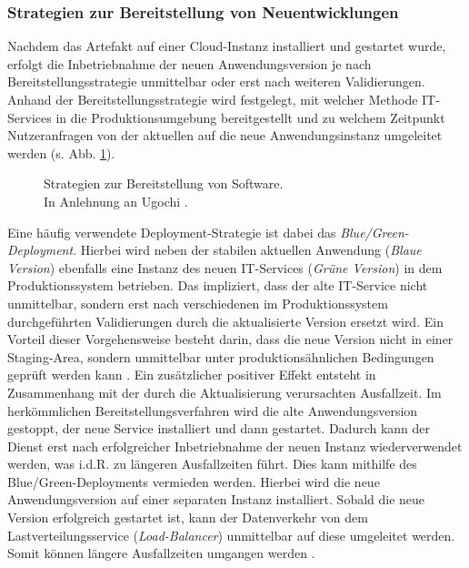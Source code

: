 \subsubsection{Strategien zur Bereitstellung von Neuentwicklungen}
\label{sec:Bereitstellungs_Strategien}
Nachdem das Artefakt auf einer Cloud-Instanz installiert und gestartet wurde, erfolgt die Inbetriebnahme der neuen Anwendungsversion je nach Bereitstellungsstrategie unmittelbar oder erst nach weiteren Validierungen. Anhand der Bereitstellungsstrategie wird festgelegt, mit welcher Methode IT-Services in die Produktionsumgebung bereitgestellt und zu welchem Zeitpunkt Nutzeranfragen von der aktuellen auf die neue Anwendungsinstanz umgeleitet werden (s. Abb. \ref{fig:DS}).
\begin{center}
	\begin{figure}[H]
		\centering
		\caption[Strategien zur Bereitstellung von Software]{Strategien zur Bereitstellung von Software.\\ In Anlehnung an Ugochi \cite{Ugochi.20220503}.}
		\label{fig:DS}
	\end{figure}
\end{center}
\vspace*{-15mm}
Eine häufig verwendete Deployment-Strategie ist dabei das \textit{Blue/Green-Deployment}. Hierbei wird neben der stabilen aktuellen Anwendung (\textit{Blaue Version}) ebenfalls eine Instanz des neuen IT-Services (\textit{Grüne Version}) in dem Produktionssystem betrieben. Das impliziert, dass der alte IT-Service nicht unmittelbar, sondern erst nach verschiedenen im Produktionssystem durchgeführten Validierungen durch die aktualisierte Version ersetzt wird. Ein Vorteil dieser Vorgehensweise besteht darin, dass die neue Version nicht in einer Staging-Area, sondern unmittelbar unter produktionsähnlichen Bedingungen geprüft werden kann \cite{Ugochi.20220503}. Ein zusätzlicher positiver Effekt entsteht in Zusammenhang mit der durch die Aktualisierung verursachten Ausfallzeit. Im herkömmlichen Bereitstellungsverfahren wird die alte Anwendungsversion gestoppt, der neue Service installiert und dann gestartet. Dadurch kann der Dienst erst nach erfolgreicher Inbetriebnahme der neuen Instanz wiederverwendet werden, was i.d.R. zu längeren Ausfallzeiten führt. Dies kann mithilfe des Blue/Green-Deployments vermieden werden. Hierbei wird die neue Anwendungsversion  auf einer separaten Instanz installiert. Sobald die neue Version erfolgreich gestartet ist, kann der Datenverkehr von dem Lastverteilungsservice (\textit{Load-Balancer}) unmittelbar auf diese umgeleitet werden. Somit können längere Ausfallzeiten umgangen werden \cite[1083]{Rudrabhatla.10720201092020}. 
